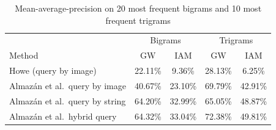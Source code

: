 \documentclass[conference]{IEEEtran}
\begin{document}
\begin{table}
\caption{Mean-average-precision on 20 most frequent bigrams and 10 most frequent trigrams}
\begin{center}
\label{table:bigrams}
\begin{tabular}{@{}lcccc@{}}
\toprule
              &\multicolumn{2}{c}{Bigrams} & \multicolumn{2}{c}{Trigrams}\\ 
Method                         & GW      & IAM       & GW      & IAM     \\ \midrule
Howe (query by image)                & 22.11\% & 9.36\%    & 28.13\% & 6.25\%  \\ 
Almaz\'{a}n et al.~query by image     & 40.67\% & 23.10\%   & 69.79\% & 42.91\% \\
Almaz\'{a}n et al.~query by string    & 64.20\% & 32.99\%   & 65.05\% & 48.87\% \\ 
Almaz\'{a}n et al.~hybrid query       & 64.32\% & 33.04\%   & 72.38\% & 49.81\%  
\end{tabular}
\end{center}
\end{table}


\end{document}
